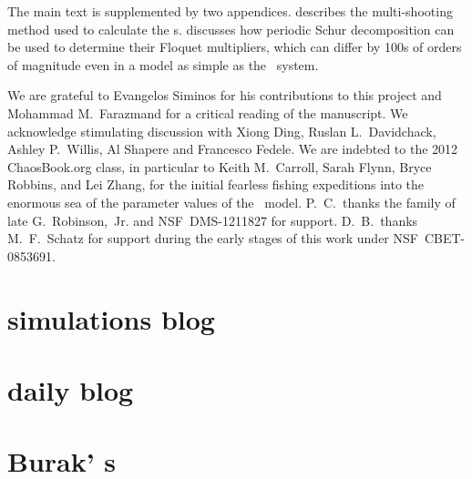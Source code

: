 \documentclass[aip,cha,
reprint,
secnumarabic,
nofootinbib, tightenlines,
nobibnotes, showkeys, showpacs,
superscriptaddress,
]{revtex4-1}
\begin{document}
The main text is supplemented by two appendices.  describes
the multi-shooting method used to calculate the \rpo s.
 discusses how periodic Schur decomposition can be used
to determine their Floquet multipliers, which can differ by 100s
of orders of magnitude even in a model as simple as the \twomode\ system.








\begin{acknowledgments}
We are grateful to Evangelos Siminos for his contributions to this project
and Mohammad M.~Farazmand for a critical reading of the manuscript.
We acknowledge stimulating discussion with
Xiong Ding,
Ruslan L.~Davidchack,
Ashley P.~Willis,
Al Shapere
and
Francesco Fedele.
We are indebted to the 2012 ChaosBook.org class, in particular to
Keith M.~Carroll,
Sarah Flynn,
Bryce Robbins,
and
Lei Zhang,
for the initial fearless fishing expeditions into the enormous sea of the
parameter values of the \twomode\ model.
P.~C.\ thanks the family of late G.~Robinson,~Jr.
and
NSF~DMS-1211827 for support. D.~B.\ thanks M.~F.\ Schatz for support during
the early stages of this work under NSF~CBET-0853691.
\end{acknowledgments}

\vspace{\baselineskip}

\appendix







\ifdraft
    \onecolumngrid

    \newpage

    \newpage
    \section{{\twoMode} simulations blog}
    \label{chap:Mathematica}


    \newpage
    \section{{\twoMode} daily blog}
    \label{chap:2modes}

    \newpage
    \section{Burak' s {\twomode}}
    \label{chap:2modesBB}


\fi %
\end{document}
